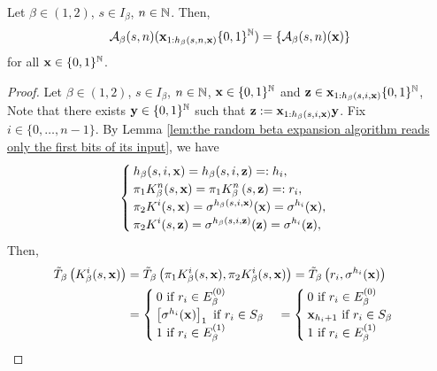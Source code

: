 \begin{corollary}Let $\beta \in (1,2)$, $s \in I_\beta$, $n \in \mathbb{N}$. Then,
    \begin{equation}\label{eq:dajani algorithm only depends on the bits that were read by the algorithm}
        \mathcal{A}_\beta(s,n)({\bf x}_{1:h_\beta(s,n,{\bf x})}\{0,1\}^{\mathbb{N}}) = \{\mathcal{A}_\beta(s,n)({\bf x})\}
    \end{equation}
    for all ${\bf x} \in \{0,1\}^{\mathbb{N}}$.
\end{corollary}
\begin{proof}
    Let $\beta \in (1,2)$, $s \in I_\beta$, $n \in \mathbb{N}$, ${\bf x}\in \{0,1\}^{\mathbb{N}}$ and ${\bf z} \in {\bf x}_{1:h_\beta(s,i,{\bf x})} \{0,1\}^{\mathbb{N}}$, Note that there exists ${\bf y} \in \{0,1\}^{\mathbb{N}}$ such that ${\bf z} := {\bf x}_{1:h_\beta(s,i,{\bf x})}{\bf y}$. Fix $i \in \{0, \ldots, n-1\}$. By Lemma \ref{lem:the random beta expansion algorithm reads only the first bits of its input}, we have 
    \begin{equation}
        \begin{cases}
            h_\beta(s,i,{\bf x}) = h_\beta(s,i,{\bf z}) =: h_i,\\
            \displaystyle \pi_1 K^n_\beta(s,{\bf x}) = \pi_1 K^n_\beta\left(s,{\bf z}\right) =: r_i,\\
            \displaystyle \pi_2 K^i(s,{\bf x}) = \sigma^{h_\beta(s,i,{\bf x})}({\bf x}) = \sigma^{h_i}({\bf x}),\\
            \displaystyle \pi_2 K^i(s,{\bf z}) = \sigma^{h_\beta(s,i,{\bf z})}({\bf z}) = \sigma^{h_i}({\bf z}),
        \end{cases}
    \end{equation}
    Then,
    \allowdisplaybreaks
    \begin{align}
        \tilde T_\beta \left( K_\beta^i(s,{\bf x}) \right) &= \tilde T_\beta \left(  \pi_1 K_\beta^i(s,{\bf x}), \pi_2 K_\beta^i(s,{\bf x})\right) = \tilde T_\beta \left(  r_i, \sigma^{h_i}({\bf x})\right)\\
        &= \nonumber \begin{cases}
            0 \text{ if } r_i \in E_\beta^{(0)}\\
            \left[\sigma^{h_i}({\bf x})\right]_1 \text{ if } r_i \in S_\beta\\
            1 \text{ if } r_i \in E_\beta^{(1)}
        \end{cases} = \begin{cases}
            0 \text{ if } r_i \in E_\beta^{(0)}\\
            {\bf x}_{h_i + 1} \text{ if } r_i \in S_\beta\\
            1 \text{ if } r_i \in E_\beta^{(1)}

\end{cases}
\end{align}
\end{proof}
